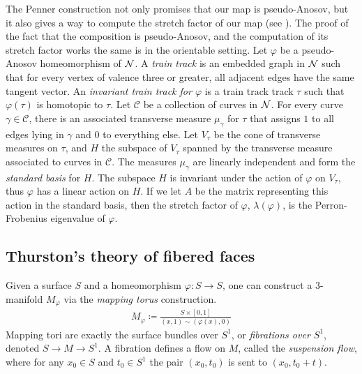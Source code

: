  The Penner construction not only promises that our map is pseudo-Anosov, but it also gives a way to
compute the stretch factor of our map (see \cite{penner1988construction}).  The proof of the fact
that the composition is pseudo-Anosov, and the computation of its stretch factor works the same is
in the orientable setting.  Let $\varphi$ be a pseudo-Anosov homeomorphism of $\mathcal{N}$.  A {\it train track} is an embedded graph in $\mathcal{N}$ such that for every vertex of valence three or greater, all adjacent edges have the same tangent vector.  An {\it invariant train track for $\varphi$} is a train track track $\tau$ such that $\varphi(\tau)$ is homotopic to $\tau$.  Let $\mathcal{C}$ be a collection of curves in $\mathcal{N}$. %
For every curve $\gamma \in\mathcal{C}$, there is an associated transverse measure
$\mu_\gamma$ for $\tau$ that assigns $1$ to all edges lying in $\gamma$ and 0 to everything else. Let $V_\tau$
be the cone of transverse measures on $\tau$, and $H$ the subspace of $V_\tau$ spanned by the
transverse measure associated to curves in $\mathcal{C}$.
The measures $\mu_\gamma$ are linearly independent and form the \textit{standard basis} for $H$. The subspace $H$ is invariant under the action of $\varphi$ on $V_\tau$, thus $\varphi$ has a linear action on $H$. If we let $A$
be the matrix representing this action in the standard basis, then the stretch factor of $\varphi$,
$\lambda(\varphi)$, is the Perron-Frobenius eigenvalue of $\varphi$.

\subsection{Thurston's theory of fibered faces}
\label{sec:thurst-fiber-face}

 Given a surface $S$ and a homeomorphism $\varphi: S \to S$, one can construct a $3$-manifold $M_\varphi$ via
the \emph{mapping torus} construction.
\begin{align*}
  M_\varphi \coloneqq \frac{S \times [0,1]}{(x,1) \sim (\varphi(x), 0)}
\end{align*}
Mapping tori are exactly the surface bundles over $S^1$, or \emph{fibrations over $S^1$}, denoted $S\rightarrow M\rightarrow S^1$. A fibration defines a {flow} on $M$,
called the \emph{suspension flow}, where for any $x_0\in S$ and $t_0\in S^1$ the pair $(x_0,t_0)$ is sent to $(x_0,t_0+t)$. %

